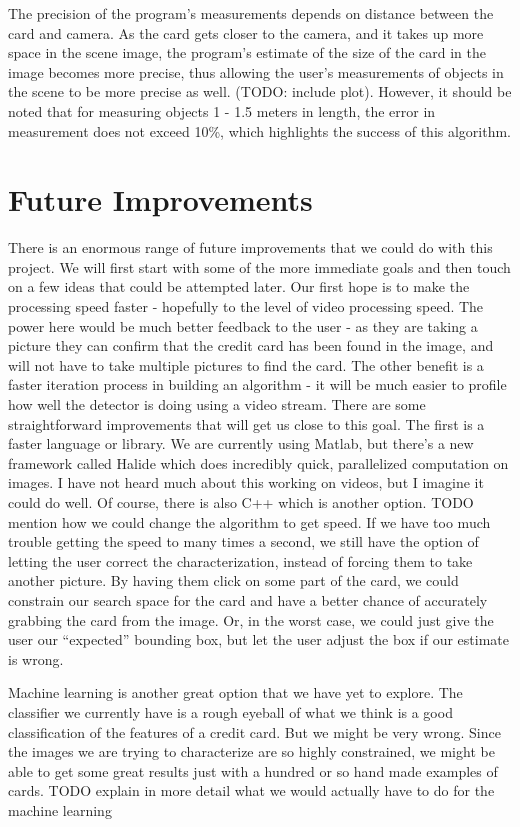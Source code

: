 \documentclass[10pt,twocolumn,letterpaper]{article}
\begin{document}
	The precision of the program’s measurements depends on distance between the card and camera. As the card gets closer to the camera, and it takes up more space in the scene image, the program’s estimate of the size of the card in the image becomes more precise, thus allowing the user’s measurements of objects in the scene to be more precise as well. (TODO: include plot). However, it should be noted that for measuring objects 1 - 1.5 meters in length, the error in measurement does not exceed 10\%, which highlights the success of this algorithm. 
	
\section{Future Improvements}

There is an enormous range of future improvements that we could do with this project. We will first start with some of the more immediate goals and then touch on a few ideas that could be attempted later. Our first hope is to make the processing speed faster - hopefully to the level of video processing speed. The power here would be much better feedback to the user - as they are taking a picture they can confirm that the credit card has been found in the image, and will not have to take multiple pictures to find the card. The other benefit is a faster iteration process in building an algorithm - it will be much easier to profile how well the detector is doing using a video stream. There are some straightforward improvements that will get us close to this goal. The first is a faster language or library. We are currently using Matlab, but there’s a new framework called Halide which does incredibly quick, parallelized computation on images. I have not heard much about this working on videos, but I imagine it could do well. Of course, there is also C++ which is another option. TODO mention how we could change the algorithm to get speed.
If we have too much trouble getting the speed to many times a second, we still have the option of letting the user correct the characterization, instead of forcing them to take another picture. By having them click on some part of the card, we could constrain our search space for the card and have a better chance of accurately grabbing the card from the image. Or, in the worst case, we could just give the user our “expected” bounding box, but let the user adjust the box if our estimate is wrong.

Machine learning is another great option that we have yet to explore. The classifier we currently have is a rough eyeball of what we think is a good classification of the features of a credit card. But we might be very wrong. Since the images we are trying to characterize are so highly constrained, we might be able to get some great results just with a hundred or so hand made examples of cards. TODO explain in more detail what we would actually have to do for the machine learning
\end{document}
